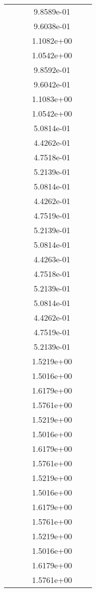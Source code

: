 \begin{xltabular}{\textwidth}{r|rS[table-format=1.3e+2]S[table-format=1.4e+2]S[table-format=1.4e+2]S[table-format=-1.5]}
&  &  & 9.8589e-01 & & \\
&  &  & 9.6038e-01 & & \\
&  &  & 1.1082e+00 & & \\
&  &  & 1.0542e+00 & & \\
&  &  & 9.8592e-01 & & \\
&  &  & 9.6042e-01 & & \\
&  &  & 1.1083e+00 & & \\
&  &  & 1.0542e+00 & & \\
&  &  & 5.0814e-01 & & \\
&  &  & 4.4262e-01 & & \\
&  &  & 4.7518e-01 & & \\
&  &  & 5.2139e-01 & & \\
&  &  & 5.0814e-01 & & \\
&  &  & 4.4262e-01 & & \\
&  &  & 4.7519e-01 & & \\
&  &  & 5.2139e-01 & & \\
&  &  & 5.0814e-01 & & \\
&  &  & 4.4263e-01 & & \\
&  &  & 4.7518e-01 & & \\
&  &  & 5.2139e-01 & & \\
&  &  & 5.0814e-01 & & \\
&  &  & 4.4262e-01 & & \\
&  &  & 4.7519e-01 & & \\
&  &  & 5.2139e-01 & & \\
&  &  & 1.5219e+00 & & \\
&  &  & 1.5016e+00 & & \\
&  &  & 1.6179e+00 & & \\
&  &  & 1.5761e+00 & & \\
&  &  & 1.5219e+00 & & \\
&  &  & 1.5016e+00 & & \\
&  &  & 1.6179e+00 & & \\
&  &  & 1.5761e+00 & & \\
&  &  & 1.5219e+00 & & \\
&  &  & 1.5016e+00 & & \\
&  &  & 1.6179e+00 & & \\
&  &  & 1.5761e+00 & & \\
&  &  & 1.5219e+00 & & \\
&  &  & 1.5016e+00 & & \\
&  &  & 1.6179e+00 & & \\
&  &  & 1.5761e+00 & & \\

\end{xltabular}
